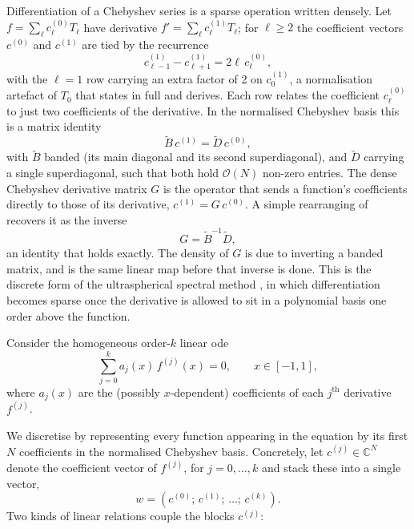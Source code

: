 Differentiation of a Chebyshev series is a sparse operation written densely. Let $f = \sum_\ell c^{(0)}_\ell T_\ell$ have derivative $f' = \sum_\ell c^{(1)}_\ell T_\ell$; for $\ell \ge 2$ the coefficient vectors $c^{(0)}$ and $c^{(1)}$ are tied by the recurrence
\begin{equation}
    c^{(1)}_{\ell-1} - c^{(1)}_{\ell+1} = 2\ell\,c^{(0)}_\ell ,
    \label{eq:cheb-recurrence}
\end{equation}
with the $\ell = 1$ row carrying an extra factor of 2 on $c^{(1)}_0$, a normalisation artefact of $T_0$ that  states in full and derives. Each row relates the coefficient $c^{(0)}_\ell$ to just two coefficients of the derivative. In the normalised Chebyshev basis this is a matrix identity
\begin{equation}
    \tilde{B}\,c^{(1)} = \tilde{D}\,c^{(0)} ,
    \label{eq:banded-factorisation}
\end{equation}
with $\tilde{B}$ banded (its main diagonal and its second superdiagonal), and $\tilde{D}$ carrying a single superdiagonal, such that both hold $\mathcal{O}(N)$ non-zero entries. The dense Chebyshev derivative matrix $G$ is the operator that sends a function's coefficients directly to those of its derivative, $c^{(1)} = G\,c^{(0)}$. A simple rearranging of  recovers it as the inverse
\begin{equation}
    G = \tilde{B}^{-1}\tilde{D} ,
    \label{eq:G-factorisation}
\end{equation}
an identity that holds exactly. The density of $G$ is due to inverting a banded matrix, and  is the same linear map before that inverse is done. This is the discrete form of the ultraspherical spectral method \cite{olver2013}, in which differentiation becomes sparse once the derivative is allowed to sit in a polynomial basis one order above the function.

Consider the homogeneous order-$k$ linear \gls{ode}
\begin{equation}
  \sum_{j=0}^{k} a_j(x)\, f^{(j)}(x) = 0, \qquad x \in [-1,1],
\end{equation}
where $a_j(x)$ are the (possibly $x$-dependent) coefficients of each $j^\text{th}$ derivative $f^{(j)}$.

We discretise by representing every function appearing in the equation
by its first $N$ coefficients in the normalised Chebyshev basis. Concretely,
let $c^{(j)} \in \mathbb{C}^N$ denote the coefficient vector of $f^{(j)}$, for $j = 0, \dots, k$ and stack these into a single vector,
\begin{equation}
  w = (c^{(0)};\, c^{(1)};\, \dots;\, c^{(k)}).
\end{equation}
Two kinds of linear relations couple the blocks $c^{(j)}$:

